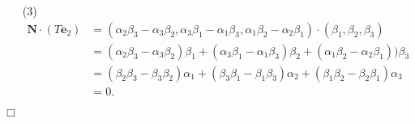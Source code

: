 \documentclass{article}
\begin{document}
\begin{enumerate}
\item[(3)]
  \begin{align*}
    \mathbf{N} \cdot (T\mathbf{e}_2)
    &= (\alpha_2 \beta_3 - \alpha_3 \beta_2,
      \alpha_3 \beta_1 - \alpha_1 \beta_3,
      \alpha_1 \beta_2 - \alpha_2 \beta_1) \cdot
      (\beta_1, \beta_2, \beta_3) \\
    &= (\alpha_2 \beta_3 - \alpha_3 \beta_2) \beta_1
      + (\alpha_3 \beta_1 - \alpha_1 \beta_3) \beta_2
      + (\alpha_1 \beta_2 - \alpha_2 \beta_1)) \beta_3 \\
    &= (\beta_2 \beta_3 - \beta_3 \beta_2) \alpha_1
      + (\beta_3 \beta_1 - \beta_1 \beta_3) \alpha_2
      + (\beta_1 \beta_2 - \beta_2 \beta_1) \alpha_3 \\
    &= 0.
  \end{align*}
\end{enumerate}
$\Box$ \\\\



\end{document}
